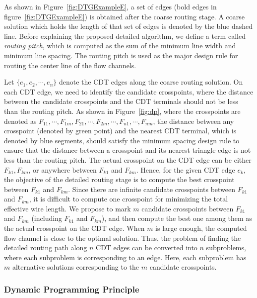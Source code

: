 \documentclass[journal]{IEEEtran}
\begin{document}
As shown in Figure~\ref{fig:DTGExampleE}, a set of edges (bold edges in figure~\ref{fig:DTGExampleE}) is obtained after the coarse routing stage. A coarse solution which holds the length of that set of edges is denoted by the blue dashed line.
Before explaining the proposed detailed algorithm, we define a term called {\em routing pitch}, which is computed as the sum of the minimum line width and minimum line spacing. 
The routing pitch is used as the major design rule for routing the center line of the flow channels. 

Let $\{e_1, e_2, \cdots, e_n\}$ denote the CDT edges along the coarse routing solution. 
On each CDT edge, we need to identify the candidate crosspoints, where the distance between the candidate crosspoints and the CDT terminals should not be less than the routing pitch. 
As shown in Figure~\ref{fig:dp}, where the crosspoints are denoted as $F_{11}, \cdots, F_{1m}, F_{21}, \cdots, F_{2m}, \cdots, F_{n1}, \cdots, F_{nm}$,  the distance between any crosspoint (denoted by green point) and the nearest CDT terminal, which is denoted by blue segments, should satisfy the minimum spacing design rule to ensure that the distance between a crosspoint and its nearest triangle edge is not less than the routing pitch.
The actual crosspoint on the CDT edge can be either $F_{k1}, F_{km}$, or anywhere between $F_{k1}$ and $F_{km}$. 
Hence, for the given CDT edge $e_k$, the objective of the detailed routing stage is to compute the best crosspoint between $F_{k1}$ and $F_{km}$. 
Since there are infinite candidate crosspoints between $F_{k1}$ and $F_{km}$, it is difficult to compute one crosspoint for minimizing the total effective wire
length.
We propose to mark $m$ candidate crosspoints between $F_{k1}$ and $F_{km}$ (including $F_{k1}$ and $F_{km}$), and then compute the best one among them as the actual crosspoint on the CDT edge. 
When $m$ is large enough, the computed flow channel is close to the optimal solution.
Thus, the problem of finding the detailed routing path along $n$ CDT edges can be converted into $n$ subproblems, where each subproblem is corresponding to an edge.
Here, each subproblem has $m$ alternative solutions corresponding to the $m$ candidate crosspoints. 

\subsubsection{Dynamic Programming Principle}
\end{document}
